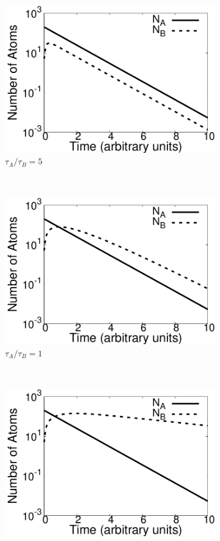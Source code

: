 \documentclass[pra,twocolumn,showpacs,amsmath,amssymb]{revtex4-1}
\begin{document}
 \begin{figure}
   \begin{subfigure}{.8\linewidth}
     \includegraphics[width=\linewidth]{t_gt_1.pdf}
     \caption{$\tau_A / \tau_B=5$}
     \label{fig:tau_gt_1}
   \end{subfigure}
 ~
   \begin{subfigure}{.8\linewidth}
     \includegraphics[width=\linewidth]{t_eq_1.pdf}
     \caption{$\tau_A / \tau_B=1$}
     \label{fig:tau_eq_1}
   \end{subfigure}
 ~
   \begin{subfigure}{.8\linewidth}
     \includegraphics[width=\linewidth]{t_lt_1.pdf}

\end{subfigure}
\end{figure}
\end{document}
